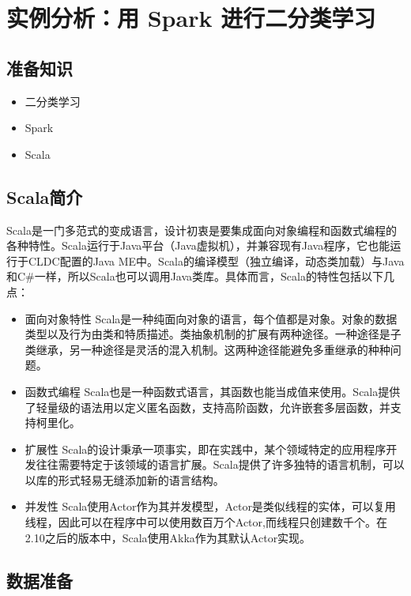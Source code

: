 \section{实例分析：用 Spark
进行二分类学习}\label{ux5b9eux4f8bux5206ux6790ux7528-spark-ux8fdbux884cux4e8cux5206ux7c7bux5b66ux4e60}

\subsection{准备知识}\label{ux51c6ux5907ux77e5ux8bc6}

\begin{itemize}
\itemsep1pt\parskip0pt
\item
  二分类学习
\item
  Spark
\item
  Scala
\end{itemize}

\subsection{Scala简介}

	Scala是一门多范式的变成语言，设计初衷是要集成面向对象编程和函数式编程的各种特性。Scala运行于Java平台（Java虚拟机），并兼容现有Java程序，它也能运行于CLDC配置的Java ME中。Scala的编译模型（独立编译，动态类加载）与Java和C\#一样，所以Scala也可以调用Java类库。具体而言，Scala的特性包括以下几点：

\begin{itemize}
	\item 面向对象特性
	Scala是一种纯面向对象的语言，每个值都是对象。对象的数据类型以及行为由类和特质描述。类抽象机制的扩展有两种途径。一种途径是子类继承，另一种途径是灵活的混入机制。这两种途径能避免多重继承的种种问题。
	\item 函数式编程
	Scala也是一种函数式语言，其函数也能当成值来使用。Scala提供了轻量级的语法用以定义匿名函数，支持高阶函数，允许嵌套多层函数，并支持柯里化。
	\item 扩展性
	Scala的设计秉承一项事实，即在实践中，某个领域特定的应用程序开发往往需要特定于该领域的语言扩展。Scala提供了许多独特的语言机制，可以以库的形式轻易无缝添加新的语言结构。
	\item 并发性
	Scala使用Actor作为其并发模型，Actor是类似线程的实体，可以复用线程，因此可以在程序中可以使用数百万个Actor,而线程只创建数千个。在2.10之后的版本中，Scala使用Akka作为其默认Actor实现。
\end{itemize}

\subsection{数据准备}\label{ux6570ux636eux51c6ux5907}


